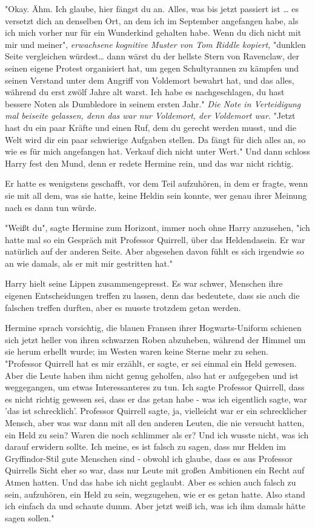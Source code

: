 {"Okay. Ähm. Ich glaube, hier fängst du an. Alles, was bis jetzt passiert ist … es versetzt dich an denselben Ort, an dem ich im September angefangen habe, als ich mich vorher nur für ein Wunderkind gehalten habe. Wenn du dich nicht mit mir und meiner", \emph{erwachsene kognitive Muster von Tom Riddle kopiert,} "dunklen Seite vergleichen würdest… dann wärst du der hellste Stern von Ravenclaw, der seinen eigene Protest organisiert hat, um gegen Schultyrannen zu kämpfen und seinen Verstand unter dem Angriff von Voldemort bewahrt hat, und das alles, während du erst zwölf Jahre alt warst. Ich habe es nachgeschlagen, du hast bessere Noten als Dumbledore in seinem ersten Jahr." \emph{Die Note in Verteidigung mal beiseite gelassen, denn das war nur Voldemort, der Voldemort war.} "Jetzt hast du ein paar Kräfte und einen Ruf, dem du gerecht werden musst, und die Welt wird dir ein paar schwierige Aufgaben stellen. Da fängt für dich alles an, so wie es für mich angefangen hat. Verkauf dich nicht unter Wert." Und dann schloss Harry fest den Mund, denn er redete Hermine rein, und das war nicht richtig.

Er hatte es wenigstens geschafft, vor dem Teil aufzuhören, in dem er fragte, wenn sie mit all dem, was sie hatte, keine Heldin sein konnte, wer genau ihrer Meinung nach es dann tun würde.

"Weißt du", sagte Hermine zum Horizont, immer noch ohne Harry anzusehen, "ich hatte mal so ein Gespräch mit Professor Quirrell, über das Heldendasein. Er war natürlich auf der anderen Seite. Aber abgesehen davon fühlt es sich irgendwie so an wie damals, als er mit mir gestritten hat."

Harry hielt seine Lippen zusammengepresst. Es war schwer, Menschen ihre eigenen Entscheidungen treffen zu lassen, denn das bedeutete, dass sie auch die falschen treffen durften, aber es musste trotzdem getan werden.

Hermine sprach vorsichtig, die blauen Fransen ihrer Hogwarts-Uniform schienen sich jetzt heller von ihren schwarzen Roben abzuheben, während der Himmel um sie herum erhellt wurde; im Westen waren keine Sterne mehr zu sehen.\\ "Professor Quirrell hat es mir erzählt, er sagte, er sei einmal ein Held gewesen. Aber die Leute haben ihm nicht genug geholfen, also hat er aufgegeben und ist weggegangen, um etwas Interessanteres zu tun. Ich sagte Professor Quirrell, dass es nicht richtig gewesen sei, dass er das getan habe - was ich eigentlich sagte, war 'das ist schrecklich'. Professor Quirrell sagte, ja, vielleicht war er ein schrecklicher Mensch, aber was war dann mit all den anderen Leuten, die nie versucht hatten, ein Held zu sein? Waren die noch schlimmer als er? Und ich wusste nicht, was ich darauf erwidern sollte. Ich meine, es ist falsch zu sagen, dass nur Helden im Gryffindor-Stil gute Menschen sind - obwohl ich glaube, dass es aus Professor Quirrells Sicht eher so war, dass nur Leute mit großen Ambitionen ein Recht auf Atmen hatten. Und das habe ich nicht geglaubt. Aber es schien auch falsch zu sein, aufzuhören, ein Held zu sein, wegzugehen, wie er es getan hatte. Also stand ich einfach da und schaute dumm. Aber jetzt weiß ich, was ich ihm damals hätte sagen sollen."

}
